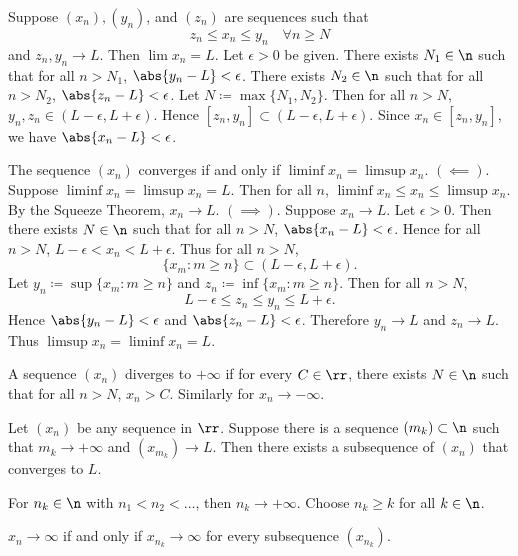 

\begin{theorem}{
    Suppose $(x_n),(y_n)$, and $(z_n)$ are sequences such that
    \[
        z_n\leq x_n\leq y_n \quad \forall n \geq N
    \]
    and $z_n, y_n \to L$.
    Then $\lim x_n = L$.
}
    Let $\epsilon > 0$ be given.
    There exists $N_1\in\n$ such that for all $n > N_1$, $\abs{y_n - L} < \epsilon$.
    There exists $N_2\in\n$ such that for all $n > N_2$, $\abs{z_n - L} < \epsilon$.
    Let $N \coloneqq \max\{N_1,N_2\}$.
    Then for all $n > N$, $y_n, z_n \in (L-\epsilon, L+\epsilon)$.
    Hence $[z_n, y_n] \subset (L-\epsilon, L+\epsilon)$.
    Since $x_n \in [z_n, y_n]$, we have $\abs{x_n - L} < \epsilon$.
\end{theorem}

\begin{theorem}{
    The sequence $(x_n)$ converges if and only if $\liminf x_n = \limsup x_n$.
}
    $(\impliedby)$.
    Suppose $\liminf x_n = \limsup x_n = L$.
    Then for all $n$, $\liminf x_n \leq x_n \leq \limsup x_n$.
    By the Squeeze Theorem, $x_n \to L$.
    $(\implies)$.
    Suppose $x_n \to L$.
    Let $\epsilon > 0$.
    Then there exists $N\in\n$ such that for all $n > N$, $\abs{x_n - L} < \epsilon$.
    Hence for all $n > N$, $L - \epsilon < x_n < L + \epsilon$.
    Thus for all $n > N$,
    \[
        \{x_m : m \geq n\} \subset (L - \epsilon, L + \epsilon).
    \]
    Let $y_n \coloneqq \sup\{x_m : m \geq n\}$ and $z_n \coloneqq \inf\{x_m : m \geq n\}$.
    Then for all $n > N$,
    \[
        L - \epsilon \leq z_n \leq y_n \leq L + \epsilon.
    \]
    Hence $\abs{y_n - L} < \epsilon$ and $\abs{z_n - L} < \epsilon$.
    Therefore $y_n \to L$ and $z_n \to L$.
    Thus $\limsup x_n = \liminf x_n = L$.
\end{theorem}

\begin{definition}[Diverges]
    A sequence $(x_n)$ diverges to $+\infty$ if for every $C\in\rr$, there exists $N\in\n$ such that for all $n > N$, $x_n > C$.
    Similarly for $x_n \to -\infty$.
\end{definition}

\begin{lemma*}{
    Let $(x_n)$ be any sequence in $\rr$.
    Suppose there is a sequence $(m_k)\subset\n$ such that $m_k \to +\infty$ and $(x_{m_k}) \to L$.
    Then there exists a subsequence of $(x_n)$ that converges to $L$.
}
\end{lemma*}

\begin{example}{
    For $n_k\in\n$ with $n_1 < n_2 < \ldots$, then $n_k \to +\infty$.
    Choose $n_k \geq k$ for all $k\in\n$.
}
\end{example}

\begin{proposition*}{
    $x_n \to \infty$ if and only if $x_{n_k} \to \infty$ for every subsequence $(x_{n_k})$.
}
\end{proposition*}